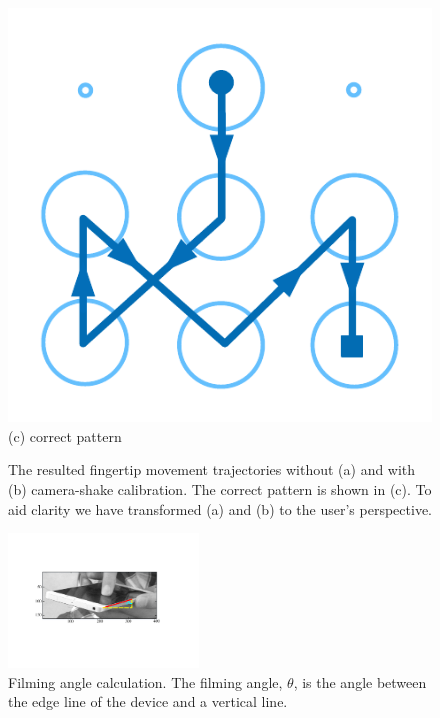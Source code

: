 \begin{figure}[!t]
{\begin{minipage}[b]{0.18\textwidth}
            \includegraphics[width=\textwidth]{fig/5-3.pdf}\\
            \centering \footnotesize (c) correct pattern
            \end{minipage}
        }
        \caption{The resulted fingertip movement trajectories without (a) and with (b) camera-shake calibration.  The correct pattern is shown in (c). To aid clarity we have transformed (a) and (b) to the user's perspective.}
        \label{fig:camera_shake_illu}
       \vspace{-2mm}
         \end{figure}

\begin{figure}[!t]
    \centering
    \includegraphics[width=0.45\textwidth]{fig/line_detection.pdf}
    \caption{Filming angle calculation. The filming angle, $\theta$, is the angle between the edge line of the device and a vertical line.}
    \label{fig:line_detection}
\end{figure}

